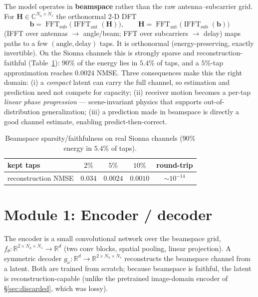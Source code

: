 \documentclass[11pt]{article}
\newcommand{\C}{\mathbb{C}}
\newcommand{\R}{\mathbb{R}}
\newcommand{\Hc}{\mathbf{H}}
\newcommand{\bs}{\mathbf{b}}
\DeclareMathOperator{\FFT}{FFT}
\DeclareMathOperator{\IFFT}{IFFT}
\begin{document}
The model operates in \textbf{beamspace} rather than the raw antenna--subcarrier grid. For
$\Hc\in\C^{N_a\times N_s}$ the orthonormal 2-D DFT
\begin{equation}
\bs = \FFT_{\text{sub}}\!\big(\IFFT_{\text{ant}}(\Hc)\big),\qquad
\Hc = \FFT_{\text{ant}}\!\big(\IFFT_{\text{sub}}(\bs)\big)
\end{equation}
(IFFT over antennas $\to$ angle/beam; FFT over subcarriers $\to$ delay) maps paths to a few
$(\text{angle},\text{delay})$ taps. It is orthonormal (energy-preserving, exactly invertible). On the
Sionna channels this is strongly sparse and reconstruction-faithful (Table~\ref{tab:beam}): $90\%$ of
the energy lies in $5.4\%$ of taps, and a $5\%$-tap approximation reaches $0.0024$ NMSE. Three
consequences make this the right domain: (i) a \emph{compact} latent can carry the full channel, so
estimation and prediction need not compete for capacity; (ii) receiver motion becomes a per-tap
\emph{linear phase progression} --- scene-invariant physics that supports out-of-distribution
generalization; (iii) a prediction made in beamspace is directly a good channel estimate, enabling
predict-then-correct.

\begin{table}[h]
\centering
\begin{tabular}{lcccc}
\toprule
kept taps & $2\%$ & $5\%$ & $10\%$ & round-trip \\
\midrule
reconstruction NMSE & $0.034$ & $\mathbf{0.0024}$ & $0.0010$ & $\sim\!10^{-14}$ \\
\bottomrule
\end{tabular}
\caption{Beamspace sparsity/faithfulness on real Sionna channels ($90\%$ energy in $5.4\%$ of taps).}
\label{tab:beam}
\end{table}

\section{Module 1: Encoder / decoder}\label{sec:encoder}

The encoder is a small convolutional network over the beamspace grid,
$f_\theta:\R^{2\times N_a\times N_s}\!\to\R^{d}$ (two conv blocks, spatial pooling, linear
projection). A symmetric decoder $g_\omega:\R^{d}\!\to\R^{2\times N_a\times N_s}$ reconstructs the
beamspace channel from a latent. Both are trained from scratch; because beamspace is faithful, the
latent is reconstruction-capable (unlike the pretrained image-domain encoder of \S\ref{sec:discarded},
which was lossy).
\end{document}
